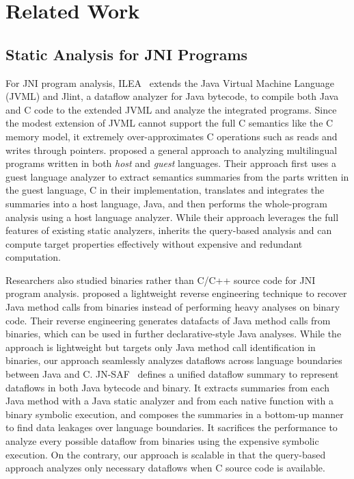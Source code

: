 \section{Related Work}\label{sec:related}
\subsection{Static Analysis for JNI Programs}
For JNI program analysis, ILEA~\cite{ILEA} extends
the Java Virtual Machine Language (JVML) and Jlint, a dataflow analyzer for
Java bytecode, to compile both Java and C code to the extended JVML and analyze
the integrated programs.  Since the modest extension of JVML cannot
support the full C semantics like the C memory model, it extremely over-approximates C
operations such as reads and writes through pointers.  \citet{LeeASE20}
proposed a general approach to analyzing multilingual programs written in both
{\it host} and {\it guest} languages.  Their approach first uses a guest
language analyzer to extract semantics summaries from the parts written in the
guest language, C in their implementation, translates and integrates the
summaries into a host language, Java, and then performs the whole-program
analysis using a host language analyzer.  While their approach leverages the
full features of existing static analyzers, \ours inherits the query-based
analysis and can compute target properties effectively without expensive and
redundant computation.

Researchers also studied binaries rather than C/C++ source code
for JNI program analysis.  \citet{scanning} proposed a lightweight reverse engineering technique to
recover Java method calls from binaries instead of performing heavy analyses on
binary code.  Their reverse engineering generates datafacts of Java method
calls from binaries, which can be used in further declarative-style Java
analyses. While the approach is lightweight but targets only Java method call
identification in binaries, our approach seamlessly analyzes dataflows across language
boundaries between Java and C.  JN-SAF~\cite{JN-SAF} defines a
unified dataflow summary to represent dataflows in both Java bytecode and
binary.  It extracts summaries from each Java method with a Java static
analyzer and from each native function with a binary symbolic execution, and
composes the summaries in a bottom-up manner to find data leakages over
language boundaries.  It sacrifices the performance to analyze every possible
dataflow from binaries using the expensive symbolic execution. On the contrary, our
approach is scalable in that the query-based approach analyzes only necessary
dataflows when C source code is available.


